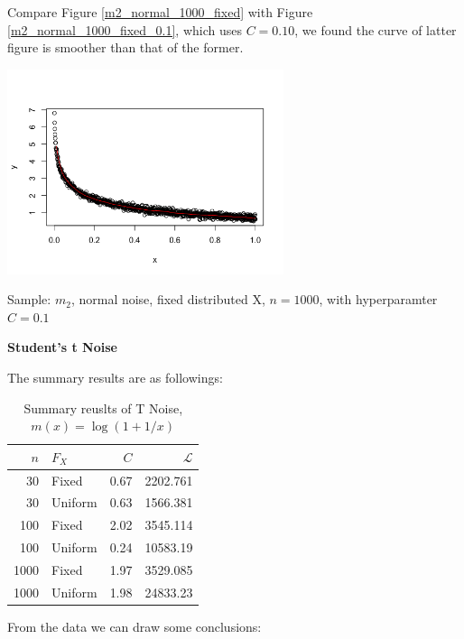 \documentclass[twoside]{article}
\begin{document}
Compare Figure \ref{m2_normal_1000_fixed} with Figure \ref{m2_normal_1000_fixed_0.1}, which uses $C=0.10$, we found the curve of latter figure is  smoother than that of the former.

\begin{center}
\makeatletter
\def\@captype{figure}
\makeatother
\includegraphics [height=6cm]{code/m2_normal_1000_fixed_0.1.png}
\caption{Sample: $m_2$, normal noise, fixed distributed X, $n=1000$, with hyperparamter $C=0.1$}
\label{m2_normal_1000_fixed_0.1}
\end{center}

\noindent \textbf{Student's t Noise}

The summary results are as followings:

\begin{table}[ht]
\centering
\caption{Summary reuslts of T Noise, $m(x)=\log(1+1/x)$}
\begin{tabular}{rlrr}
  \hline
  $n$ & $F_X$ & $C$ & $\mathcal{L}$ \\ 
  \hline
  30 & Fixed & 0.67 & 2202.761 \\ 
  30 & Uniform & 0.63 & 1566.381\\ 
  \hline
  100 & Fixed & 2.02 & 3545.114\\
  100 & Uniform & 0.24 & 10583.19\\
  \hline
  1000 & Fixed & 1.97 & 3529.085\\
  1000 & Uniform & 1.98 & 24833.23\\
  \hline
\end{tabular}
\label{cu}
\end{table}

From the data we can draw some conclusions:
\end{document}

